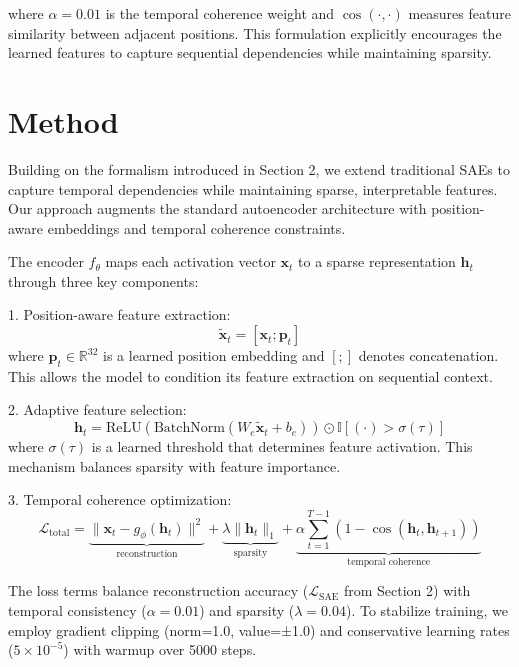 where $\alpha=0.01$ is the temporal coherence weight and $\cos(\cdot,\cdot)$ measures feature similarity between adjacent positions. This formulation explicitly encourages the learned features to capture sequential dependencies while maintaining sparsity.

\section{Method}
Building on the formalism introduced in Section 2, we extend traditional SAEs to capture temporal dependencies while maintaining sparse, interpretable features. Our approach augments the standard autoencoder architecture with position-aware embeddings and temporal coherence constraints.

The encoder $f_\theta$ maps each activation vector $\mathbf{x}_t$ to a sparse representation $\mathbf{h}_t$ through three key components:

1. Position-aware feature extraction:
\begin{equation}
\tilde{\mathbf{x}}_t = [\mathbf{x}_t; \mathbf{p}_t]
\end{equation}
where $\mathbf{p}_t \in \mathbb{R}^{32}$ is a learned position embedding and $[;]$ denotes concatenation. This allows the model to condition its feature extraction on sequential context.

2. Adaptive feature selection:
\begin{equation}
\mathbf{h}_t = \text{ReLU}(\text{BatchNorm}(W_e\tilde{\mathbf{x}}_t + b_e)) \odot \mathbb{I}[(\cdot) > \sigma(\tau)]
\end{equation}
where $\sigma(\tau)$ is a learned threshold that determines feature activation. This mechanism balances sparsity with feature importance.

3. Temporal coherence optimization:
\begin{equation}
\mathcal{L}_{\text{total}} = \underbrace{\|\mathbf{x}_t - g_\phi(\mathbf{h}_t)\|^2}_{\text{reconstruction}} + \underbrace{\lambda\|\mathbf{h}_t\|_1}_{\text{sparsity}} + \underbrace{\alpha\sum_{t=1}^{T-1}(1 - \cos(\mathbf{h}_t, \mathbf{h}_{t+1}))}_{\text{temporal coherence}}
\end{equation}

The loss terms balance reconstruction accuracy ($\mathcal{L}_{\text{SAE}}$ from Section 2) with temporal consistency ($\alpha=0.01$) and sparsity ($\lambda=0.04$). To stabilize training, we employ gradient clipping (norm=1.0, value=±1.0) and conservative learning rates ($5\times10^{-5}$) with warmup over 5000 steps.

